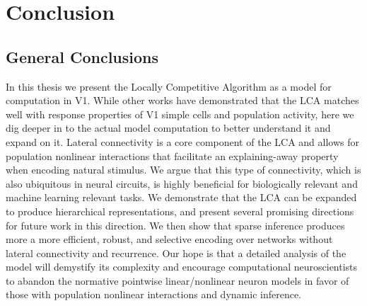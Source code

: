 \chapter{Conclusion}\label{ch:conclusion}

\section{General Conclusions}\label{sec:ch5_summary}
In this thesis we present the Locally Competitive Algorithm as a model for computation in V1.
While other works \parencite{zhu2013visual,olshausen1997sparse,vinje2000sparse} have demonstrated that the LCA matches well with response properties of V1 simple cells and population activity, here we dig deeper in to the actual model computation to better understand it and expand on it.
Lateral connectivity is a core component of the LCA and allows for population nonlinear interactions that facilitate an explaining-away property when encoding natural stimulus.
We argue that this type of connectivity, which is also ubiquitous in neural circuits, is highly beneficial for biologically relevant and machine learning relevant tasks.
We demonstrate that the LCA can be expanded to produce hierarchical representations, and present several promising directions for future work in this direction.
We then show that sparse inference produces more a more efficient, robust, and selective encoding over networks without lateral connectivity and recurrence.
Our hope is that a detailed analysis of the model will demystify its complexity and encourage computational neuroscientists to abandon the normative pointwise linear/nonlinear neuron models in favor of those with population nonlinear interactions and dynamic inference.


